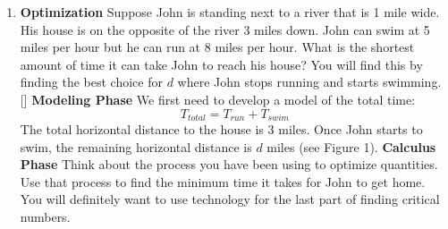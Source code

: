 \documentclass[10pt]{article}
\begin{document}
\begin{enumerate}
\newpage
\item {\bf Optimization} Suppose John is standing next to a river that is 1 mile wide. His house is on the opposite of the river 3 miles down. John can swim at 5 miles per hour but he can run at 8 miles per hour. What is the shortest amount of time it can take John to reach his house? You will find this by finding the best choice for $d$ where John stops running and starts swimming.\\
[]{
{\bf Modeling Phase} We first need to develop a model of the total time: $$T_{total}=T_{run}+T_{swim}$$
The total horizontal distance to the house is $3$ miles.  Once John starts to swim, the remaining horizontal distance is $d$ miles (see Figure 1). 
}{
}
{\bf Calculus Phase} Think about the process you have been using to optimize quantities. Use that process to find the minimum time it takes for John to get home. You will definitely want to use technology for the last part of finding critical numbers.


    \vfill



\newpage











\end{enumerate}
\end{document}
